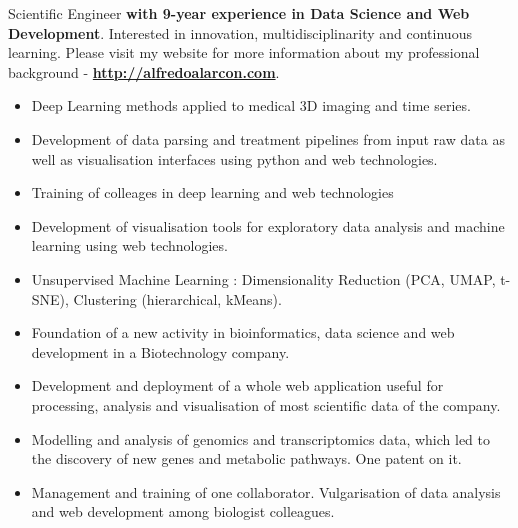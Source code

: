 \documentclass[9pt,a4paper]{altacv}%
\begin{document}
\small{Scientific Engineer \textbf{with 9-year experience in Data Science and  Web Development}. Interested in innovation, multidisciplinarity and continuous learning.
Please visit my website for more information about my professional background - \textbf{\href{http://alfredoalarcon.com}{http://alfredoalarcon.com}}.


\begin{itemize}
  \item Deep Learning methods applied to medical 3D imaging and time series.
  \item Development of data parsing and treatment pipelines from input raw data as well as visualisation interfaces using python and web technologies.
  \item Training of colleages in deep learning and web technologies
\end{itemize}

\divider

\begin{itemize}
  \item Development of visualisation tools for exploratory data analysis and machine learning using web technologies.
  \item Unsupervised Machine Learning : Dimensionality Reduction (PCA, UMAP, t-SNE), Clustering (hierarchical, kMeans).
\end{itemize}

\divider

\begin{itemize}
  \item Foundation of a new activity in bioinformatics, data science and web development in a Biotechnology company.
  \item Development and deployment of a whole web application useful for processing, analysis and visualisation of most scientific data of the company.
  \item Modelling and analysis of genomics and transcriptomics data, which led to the discovery of new genes and metabolic pathways. One patent on it.
  \item Management and training of one collaborator. Vulgarisation of data analysis and web development among biologist colleagues.
\end{itemize}

}
\end{document}
